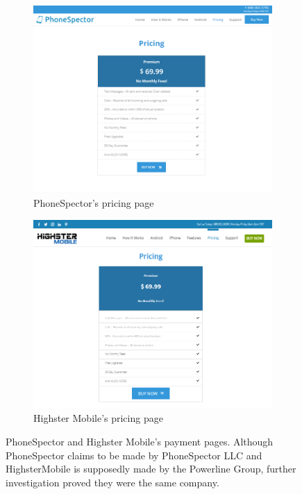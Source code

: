 \documentclass[acmtog]{acmart}
\begin{document}
\begin{figure}
	\centering
	\begin{subfigure}{0.8\columnwidth}
		\centering
		\includegraphics[width=0.9\linewidth]{../images/phonespector_small.png}
		\caption{PhoneSpector's pricing page }
		\label{fig:phonespector}
	\end{subfigure}%
	\begin{subfigure}{0.8\columnwidth}
		\centering
		\includegraphics[width=0.9\linewidth]{../images/highstermobile_small.png}
		\caption{Highster Mobile's pricing page}
	\end{subfigure}
	\caption{PhoneSpector and Highster Mobile's payment pages. Although 
	PhoneSpector claims to be made by PhoneSpector LLC and HighsterMobile is 
	supposedly made by the Powerline Group, further investigation proved they 
	were the same company.}
	\label{fig:ilfmobiles}
\end{figure}
\end{document}
